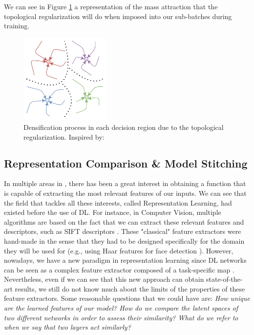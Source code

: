 \documentclass[../main.tex]{subfiles}
\begin{document}
We can see in Figure \ref{fig:attrac} a representation of the mass attraction that the topological regularization will do when imposed into our sub-batches during training.

\begin{figure}[!ht]
    \centering
    \includegraphics[width=0.4\textwidth]{figures/bg/atractor.pdf} 
    \caption{Densification process in each decision region due to the topological regularization. Inspired by: \cite{torres_hopfield_2019}}
    \label{fig:attrac}
\end{figure}

\subsection{Representation Comparison \& Model Stitching}
\label{sec:repLearn}

In multiple areas in , there has been a great interest in obtaining a function that is capable of extracting the most relevant features of our inputs. We can see that the field that tackles all these interests, called Representation Learning, had existed before the use of DL. For instance, in Computer Vision, multiple algorithms are based on the fact that we can extract these relevant features and descriptors, such as SIFT descriptors \cite{gonzalez_digital_2002}. These "classical" feature extractors were hand-made in the sense that they had to be designed specifically for the domain they will be used for (e.g., using Haar features for face detection \cite{viola_rapid_2001}). However, nowadays, we have a new paradigm in representation learning since DL networks can be seen as a complex feature extractor composed of a task-specific map \cite{moschella_relative_2022}. Nevertheless, even if we can see that this new approach can obtain state-of-the-art results, we still do not know much about the limits of the properties of these feature extractors. Some reasonable questions that we could have are: \textit{How unique are the learned features of our model? How do we compare the latent spaces of two different networks in order to assess their similarity? What do we refer to when we say that two layers act similarly?}
\end{document}
